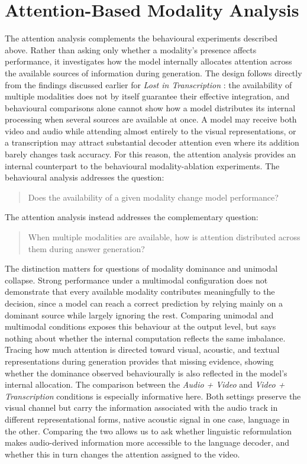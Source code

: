 \section{Attention-Based Modality Analysis}
\label{sec:attention_analysis}
The attention analysis complements the behavioural experiments described above. Rather than asking only whether a modality's presence affects performance, it investigates how the model internally allocates attention across the available sources of information during generation.
The design follows directly from the findings discussed earlier for \textit{Lost in Transcription} \cite{deodati2026lost}: the availability of multiple modalities does not by itself guarantee their effective integration, and behavioural comparisons alone cannot show how a model distributes its internal processing when several sources are available at once. A model may receive both video and audio while attending almost entirely to the visual representations, or a transcription may attract substantial decoder attention even where its addition barely changes task accuracy.
For this reason, the attention analysis provides an internal counterpart to the behavioural modality-ablation experiments. The behavioural analysis addresses the question:
\begin{quote}
Does the availability of a given modality change model performance?
\end{quote}
The attention analysis instead addresses the complementary question:
\begin{quote}
When multiple modalities are available, how is attention distributed across them during answer generation?
\end{quote}
The distinction matters for questions of modality dominance and unimodal collapse. Strong performance under a multimodal configuration does not demonstrate that every available modality contributes meaningfully to the decision, since a model can reach a correct prediction by relying mainly on a dominant source while largely ignoring the rest. Comparing unimodal and multimodal conditions exposes this behaviour at the output level, but says nothing about whether the internal computation reflects the same imbalance. Tracing how much attention is directed toward visual, acoustic, and textual representations during generation provides that missing evidence, showing whether the dominance observed behaviourally is also reflected in the model's internal allocation.
The comparison between the \textit{Audio + Video} and \textit{Video + Transcription} conditions is especially informative here. Both settings preserve the visual channel but carry the information associated with the audio track in different representational forms, native acoustic signal in one case, language in the other. Comparing the two allows us to ask whether linguistic reformulation makes audio-derived information more accessible to the language decoder, and whether this in turn changes the attention assigned to the video.
